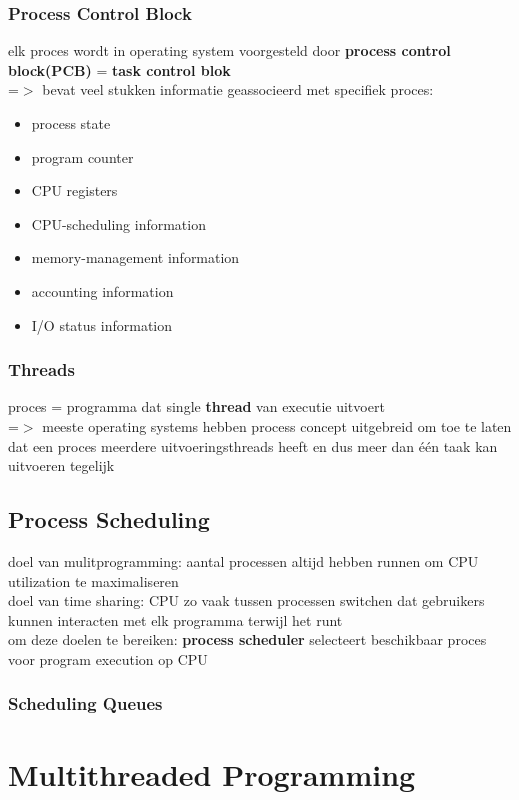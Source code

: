 \documentclass{report}
\begin{document}
\subsection{Process Control Block}
elk proces wordt in operating system voorgesteld door \textbf{process control block(PCB)} = \textbf{task control blok}
\\=$>$ bevat veel stukken informatie geassocieerd met specifiek proces:
\begin{itemize}
\item process state
\item program counter
\item CPU registers
\item CPU-scheduling information
\item memory-management information
\item accounting information
\item I/O status information
\end{itemize}

\subsection{Threads}
proces = programma dat single \textbf{thread} van executie uitvoert
\\=$>$ meeste operating systems hebben process concept uitgebreid om toe te laten dat een proces meerdere uitvoeringsthreads heeft en dus meer dan \'e\'en taak kan uitvoeren tegelijk

\section{Process Scheduling}
doel van mulitprogramming: aantal processen altijd hebben runnen om CPU utilization te maximaliseren
\\doel van time sharing: CPU zo vaak tussen processen switchen dat gebruikers kunnen interacten met elk programma terwijl het runt
\\om deze doelen te bereiken: \textbf{process scheduler} selecteert beschikbaar proces voor program execution op CPU

\subsection{Scheduling Queues}
\chapter{Multithreaded Programming}
\end{document}
